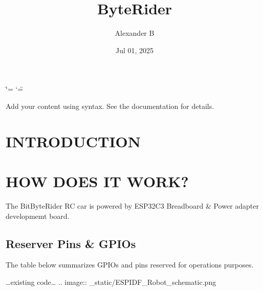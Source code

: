 \documentclass[letterpaper,10pt,english]{sphinxmanual}
\title{ByteRider}
\date{Jul 01, 2025}
\author{Alexander B}
\begin{document}
\ifdefined\shorthandoff
  \ifnum\catcode`\=\string=\active\shorthandoff{=}\fi
  \ifnum\catcode`\"=\active{}\fi
\fi

\pagestyle{empty}
\sphinxmaketitle
\pagestyle{plain}
\sphinxtableofcontents
\pagestyle{normal}
\label{\detokenize{index::doc}}


\sphinxAtStartPar
Add your content using  syntax. See the
documentation for details.

\sphinxstepscope


\chapter{INTRODUCTION}
\label{\detokenize{intro:introduction}}\label{\detokenize{intro::doc}}
\sphinxstepscope


\chapter{HOW DOES IT WORK?}
\label{\detokenize{overview:how-does-it-work}}\label{\detokenize{overview::doc}}
\sphinxAtStartPar
The BitByteRider RC car is powered by ESP32\sphinxhyphen{}C3 Breadboard \& Power adapter developmemt board.


\section{Reserver Pins \& GPIOs}
\label{\detokenize{overview:reserver-pins-gpios}}
\sphinxAtStartPar
The table below summarizes GPIOs and pins reserved for operations purposes.

\sphinxAtStartPar
…existing code…
.. image:: \_static/ESP\sphinxhyphen{}IDF\_Robot\_schematic.png
\end{document}
